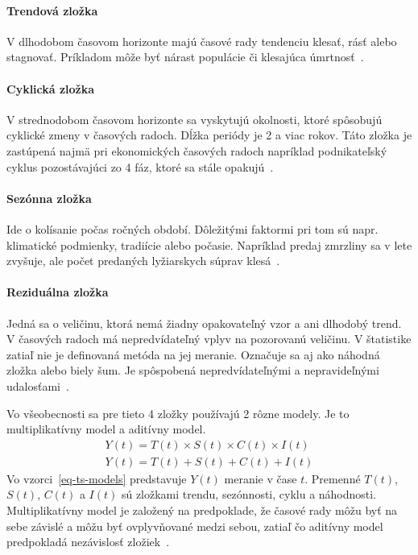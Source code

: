 \documentclass[a4paper,slovak,12pt,appendix]{article}
\begin{document}
\paragraph{Trendová zložka}
V dlhodobom časovom horizonte majú časové rady tendenciu klesať, rásť alebo
stagnovať. Príkladom môže byť nárast populácie či klesajúca
úmrtnosť~\cite{Agrawal2013}.

\paragraph{Cyklická zložka}
V strednodobom časovom horizonte sa vyskytujú okolnosti, ktoré spôsobujú
cyklické zmeny v časových radoch. Dĺžka periódy je 2 a viac rokov. Táto zložka
je zastúpená najmä pri ekonomických časových radoch napríklad podnikateľský
cyklus pozostávajúci zo 4 fáz, ktoré sa stále opakujú~\cite{Agrawal2013}.

\paragraph{Sezónna zložka}
Ide o kolísanie počas ročných období. Dôležitými faktormi pri tom sú napr.
klimatické podmienky, tradiície alebo počasie. Napríklad predaj zmrzliny sa
v lete zvyšuje, ale počet predaných lyžiarskych súprav klesá~\cite{Agrawal2013}.

\paragraph{Reziduálna zložka}
Jedná sa o veličinu, ktorá nemá žiadny opakovateľný vzor a ani dlhodobý trend.
V časových radoch má nepredvídateľný vplyv na pozorovanú veličinu. V štatistike
zatiaľ nie je definovaná metóda na jej meranie. Označuje sa aj ako náhodná
zložka alebo biely šum. Je spôspobená nepredvídateľnými a nepravideľnými
udalosťami~\cite{Agrawal2013}.

Vo všeobecnosti sa pre tieto 4 zložky používajú 2 rôzne modely. Je to
multiplikatívny model a aditívny model.
\begin{equation}
  \begin{split}
    Y(t) = T(t) \times S(t) \times C(t) \times I(t)
    \\
    Y(t) = T(t) + S(t) + C(t) + I(t)
  \end{split}
  \label{eq-ts-models}
\end{equation}
Vo vzorci~\ref{eq-ts-models} predstavuje $Y(t)$ meranie v čase $t$. Premenné
$T(t)$, $S(t)$, $C(t)$ a $I(t)$ sú zložkami trendu, sezónnosti,
cyklu a náhodnosti. Multiplikatívny model je založený na predpoklade, že časové
rady môžu byť na sebe závislé a môžu byť ovplyvňované medzi sebou, zatiaľ čo
aditívny model predpokladá nezávislosť zložiek~\cite{Agrawal2013}.
\end{document}
